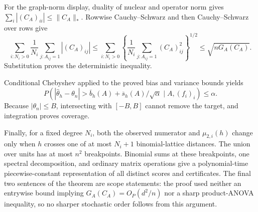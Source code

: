 For the graph-norm display, duality of nuclear and operator norm gives
\(\sum_i|(C_A)_{ii}|\leq\|C_A\|_*\).  Rowwise Cauchy--Schwarz and then Cauchy--Schwarz over rows give
\[
 \sum_{i:N_i>0}\frac1{N_i}\sum_{j:A_{ij}=1}|(C_A)_{ij}|
 \leq\sum_{i:N_i>0}\left\{\frac1{N_i}\sum_{j:A_{ij}=1}(C_A)_{ij}^2\right\}^{1/2}
 \leq\sqrt{nG_A(C_A)}.
\]
Substitution proves the deterministic inequality.

Conditional Chebyshev applied to the proved bias and variance bounds yields
\[
 P\!\left(|\widehat\theta_h-\theta_n|>
 \overline b_h(A)+\overline s_h(A)/\sqrt\alpha
 \mid A,(f_i)_i\right)\leq\alpha.
\]
Because \(|\theta_n|\leq B\), intersecting with \([-B,B]\) cannot remove the target, and integration proves coverage.

Finally, for a fixed degree \(N_i\), both the observed numerator and \(\mu_{2,i}(h)\) change only when \(h\) crosses one of at most \(N_i+1\) binomial-lattice distances.  The union over units has at most \(n^2\) breakpoints.  Binomial sums at these breakpoints, one spectral decomposition, and ordinary matrix operations give a polynomial-time piecewise-constant representation of all distinct scores and certificates.  The final two sentences of the theorem are scope statements: the proof used neither an entrywise bound implying \(G_A(C_A)=O_P(d^2/n)\) nor a sharp product-ANOVA inequality, so no sharper stochastic order follows from this argument.